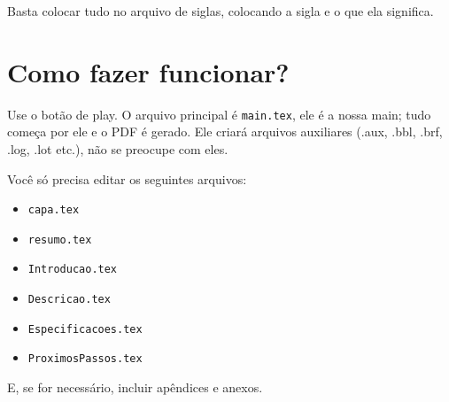 Basta colocar tudo no arquivo de siglas, colocando a sigla e o que ela significa.  

\section{Como fazer funcionar?}

Use o botão de play.  
O arquivo principal é \texttt{main.tex}, ele é a nossa main; tudo começa por ele e o PDF é gerado.  
Ele criará arquivos auxiliares (.aux, .bbl, .brf, .log, .lot etc.), não se preocupe com eles.

Você só precisa editar os seguintes arquivos:

\begin{itemize}
    \item \texttt{capa.tex}
    \item \texttt{resumo.tex}
    \item \texttt{Introducao.tex}
    \item \texttt{Descricao.tex}
    \item \texttt{Especificacoes.tex}
    \item \texttt{ProximosPassos.tex}
\end{itemize}

E, se for necessário, incluir apêndices e anexos.


